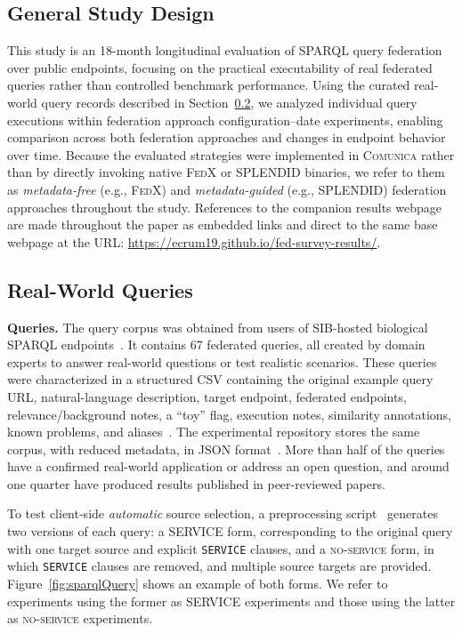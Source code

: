 \documentclass[runningheads]{llncs}
\begin{document}
\subsection{General Study Design}\label{sec4.1}
This study is an 18-month longitudinal evaluation of SPARQL query federation over public endpoints, focusing on the practical executability of real federated queries rather than controlled benchmark performance. 
Using the curated real-world query records described in Section~\ref{sec4.2}, we analyzed individual query executions within federation approach configuration--date experiments, enabling comparison across both federation approaches and changes in endpoint behavior over time. 
Because the evaluated strategies were implemented in \textsc{Comunica} rather than by directly invoking native \textsc{FedX} or \textsc{SPLENDID} binaries, we refer to them as \textit{metadata-free} (e.g., \textsc{FedX}) and \textit{metadata-guided} (e.g., \textsc{SPLENDID}) federation approaches throughout the study.
References to the companion results webpage are made throughout the paper as embedded links and direct to the same base webpage at the URL: \url{https://ecrum19.github.io/fed-survey-results/}.

\subsection{Real-World Queries}\label{sec4.2}
\textbf{Queries.}
The query corpus was obtained from users of SIB-hosted biological SPARQL endpoints~\cite{Bolleman2025sibqueries}. 
It contains 67 federated queries, all created by domain experts to answer real-world questions or test realistic scenarios. 
These queries were characterized in a structured CSV containing the original example query URL, natural-language description, target endpoint, federated endpoints, relevance/background notes, a ``toy'' flag, execution notes, similarity annotations, known problems, and aliases~\cite{fedSurveyResultsRepo}. 
The experimental repository stores the same corpus, with reduced metadata, in JSON format~\cite{fedSparqlSurveyExperimentsRepo}. 
More than half of the queries have a confirmed real-world application or address an open question, and around one quarter have produced results published in peer-reviewed papers.

To test client-side \textit{automatic} source selection, a preprocessing script~\cite{fedSparqlSurveyExperimentsRepo} generates two versions of each query: a \textsc{SERVICE} form, corresponding to the original query with one target source and explicit \texttt{SERVICE} clauses, and a \textsc{no-service} form, in which \texttt{SERVICE} clauses are removed, and multiple source targets are provided. 
Figure~\ref{fig:sparqlQuery} shows an example of both forms. 
We refer to experiments using the former as \textsc{SERVICE} experiments and those using the latter as \textsc{no-service} experiments.
\end{document}
